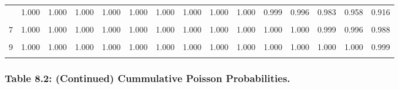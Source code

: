 \documentclass[
]{article}
\begin{document}
\begin{table}[!h]
{\begin{tabular}[t]{ccccccccccccccc}
\addlinespace
5 & 1.000 & 1.000 & 1.000 & 1.000 & 1.000 & 1.000 & 1.000 & 1.000 & 1.000 & 0.999 & 0.996 & 0.983 & 0.958 & 0.916\\
\cellcolor{gray!10}{6} & \cellcolor{gray!10}{1.000} & \cellcolor{gray!10}{1.000} & \cellcolor{gray!10}{1.000} & \cellcolor{gray!10}{1.000} & \cellcolor{gray!10}{1.000} & \cellcolor{gray!10}{1.000} & \cellcolor{gray!10}{1.000} & \cellcolor{gray!10}{1.000} & \cellcolor{gray!10}{1.000} & \cellcolor{gray!10}{1.000} & \cellcolor{gray!10}{0.999} & \cellcolor{gray!10}{0.995} & \cellcolor{gray!10}{0.986} & \cellcolor{gray!10}{0.966}\\
7 & 1.000 & 1.000 & 1.000 & 1.000 & 1.000 & 1.000 & 1.000 & 1.000 & 1.000 & 1.000 & 1.000 & 0.999 & 0.996 & 0.988\\
\cellcolor{gray!10}{8} & \cellcolor{gray!10}{1.000} & \cellcolor{gray!10}{1.000} & \cellcolor{gray!10}{1.000} & \cellcolor{gray!10}{1.000} & \cellcolor{gray!10}{1.000} & \cellcolor{gray!10}{1.000} & \cellcolor{gray!10}{1.000} & \cellcolor{gray!10}{1.000} & \cellcolor{gray!10}{1.000} & \cellcolor{gray!10}{1.000} & \cellcolor{gray!10}{1.000} & \cellcolor{gray!10}{1.000} & \cellcolor{gray!10}{0.999} & \cellcolor{gray!10}{0.996}\\
9 & 1.000 & 1.000 & 1.000 & 1.000 & 1.000 & 1.000 & 1.000 & 1.000 & 1.000 & 1.000 & 1.000 & 1.000 & 1.000 & 0.999\\
\addlinespace
\cellcolor{gray!10}{10} & \cellcolor{gray!10}{1.000} & \cellcolor{gray!10}{1.000} & \cellcolor{gray!10}{1.000} & \cellcolor{gray!10}{1.000} & \cellcolor{gray!10}{1.000} & \cellcolor{gray!10}{1.000} & \cellcolor{gray!10}{1.000} & \cellcolor{gray!10}{1.000} & \cellcolor{gray!10}{1.000} & \cellcolor{gray!10}{1.000} & \cellcolor{gray!10}{1.000} & \cellcolor{gray!10}{1.000} & \cellcolor{gray!10}{1.000} & \cellcolor{gray!10}{1.000}\\
\bottomrule
\end{tabular}}
\end{table}

\newpage

\subsubsection{Table 8.2: (Continued) Cummulative Poisson
Probabilities.}\label{table-8.2-continued-cummulative-poisson-probabilities.}
\end{document}
